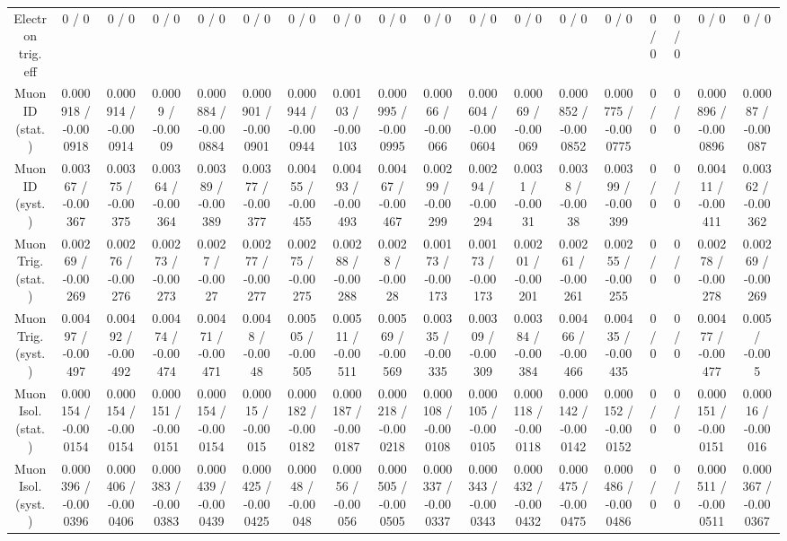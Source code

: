 \documentclass[10pt]{article}
\begin{document}
\begin{table}[htbp]
\begin{center}
\begin{tabular}{|c|c|c|c|c|c|c|c|c|c|c|c|c|c|c|c|c|c|}
  Electron trig. eff & 0 / 0 & 0 / 0 & 0 / 0 & 0 / 0 & 0 / 0 & 0 / 0 & 0 / 0 & 0 / 0 & 0 / 0 & 0 / 0 & 0 / 0 & 0 / 0 & 0 / 0 & 0 / 0 & 0 / 0 & 0 / 0 & 0 / 0 \\ 
  Muon ID (stat.) & 0.000918 / -0.000918 & 0.000914 / -0.000914 & 0.0009 / -0.0009 & 0.000884 / -0.000884 & 0.000901 / -0.000901 & 0.000944 / -0.000944 & 0.00103 / -0.00103 & 0.000995 / -0.000995 & 0.00066 / -0.00066 & 0.000604 / -0.000604 & 0.00069 / -0.00069 & 0.000852 / -0.000852 & 0.000775 / -0.000775 & 0 / 0 & 0 / 0 & 0.000896 / -0.000896 & 0.00087 / -0.00087 \\ 
  Muon ID (syst.) & 0.00367 / -0.00367 & 0.00375 / -0.00375 & 0.00364 / -0.00364 & 0.00389 / -0.00389 & 0.00377 / -0.00377 & 0.00455 / -0.00455 & 0.00493 / -0.00493 & 0.00467 / -0.00467 & 0.00299 / -0.00299 & 0.00294 / -0.00294 & 0.0031 / -0.0031 & 0.0038 / -0.0038 & 0.00399 / -0.00399 & 0 / 0 & 0 / 0 & 0.00411 / -0.00411 & 0.00362 / -0.00362 \\ 
  Muon Trig. (stat.) & 0.00269 / -0.00269 & 0.00276 / -0.00276 & 0.00273 / -0.00273 & 0.0027 / -0.0027 & 0.00277 / -0.00277 & 0.00275 / -0.00275 & 0.00288 / -0.00288 & 0.0028 / -0.0028 & 0.00173 / -0.00173 & 0.00173 / -0.00173 & 0.00201 / -0.00201 & 0.00261 / -0.00261 & 0.00255 / -0.00255 & 0 / 0 & 0 / 0 & 0.00278 / -0.00278 & 0.00269 / -0.00269 \\ 
  Muon Trig. (syst.) & 0.00497 / -0.00497 & 0.00492 / -0.00492 & 0.00474 / -0.00474 & 0.00471 / -0.00471 & 0.0048 / -0.0048 & 0.00505 / -0.00505 & 0.00511 / -0.00511 & 0.00569 / -0.00569 & 0.00335 / -0.00335 & 0.00309 / -0.00309 & 0.00384 / -0.00384 & 0.00466 / -0.00466 & 0.00435 / -0.00435 & 0 / 0 & 0 / 0 & 0.00477 / -0.00477 & 0.005 / -0.005 \\ 
  Muon Isol. (stat.) & 0.000154 / -0.000154 & 0.000154 / -0.000154 & 0.000151 / -0.000151 & 0.000154 / -0.000154 & 0.00015 / -0.00015 & 0.000182 / -0.000182 & 0.000187 / -0.000187 & 0.000218 / -0.000218 & 0.000108 / -0.000108 & 0.000105 / -0.000105 & 0.000118 / -0.000118 & 0.000142 / -0.000142 & 0.000152 / -0.000152 & 0 / 0 & 0 / 0 & 0.000151 / -0.000151 & 0.00016 / -0.00016 \\ 
  Muon Isol. (syst.) & 0.000396 / -0.000396 & 0.000406 / -0.000406 & 0.000383 / -0.000383 & 0.000439 / -0.000439 & 0.000425 / -0.000425 & 0.00048 / -0.00048 & 0.00056 / -0.00056 & 0.000505 / -0.000505 & 0.000337 / -0.000337 & 0.000343 / -0.000343 & 0.000432 / -0.000432 & 0.000475 / -0.000475 & 0.000486 / -0.000486 & 0 / 0 & 0 / 0 & 0.000511 / -0.000511 & 0.000367 / -0.000367 \\ 

\end{tabular}
\end{center}
\end{table}
\end{document}
